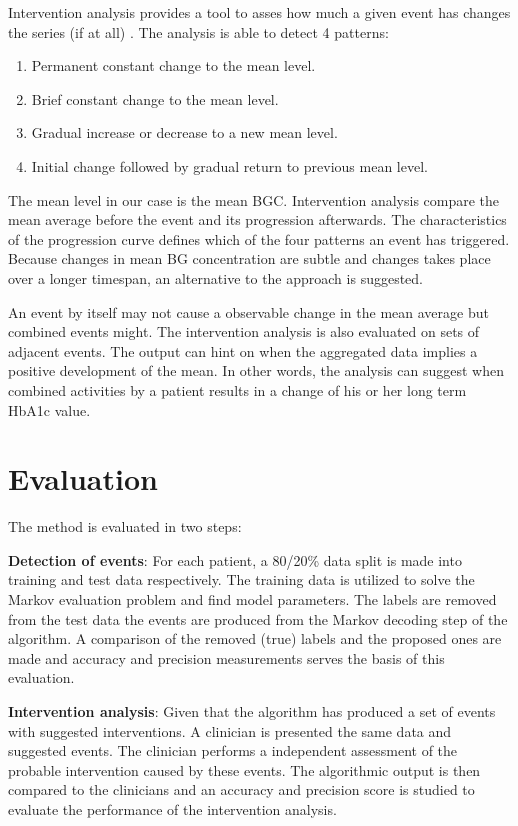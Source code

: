 Intervention analysis provides a tool to asses how much a given event has changes the series (if at all) \parencite{box2015time}.
The analysis is able to detect 4 patterns:

\begin{enumerate}
  \item Permanent constant change to the mean level.
  \item Brief constant change to the mean level.
  \item Gradual increase or decrease to a new mean level.
  \item Initial change followed by gradual return to previous mean level.
\end{enumerate}

The mean level in our case is the mean BGC.
Intervention analysis compare the mean average before the event and its progression afterwards.
The characteristics of the progression curve defines which of the four patterns an event has triggered.
Because changes in mean BG concentration are subtle and changes takes place over a longer timespan, an alternative to the approach is suggested.

An event by itself may not cause a observable change in the mean average but combined events might.
The intervention analysis is also evaluated on sets of adjacent events.
The output can hint on when the aggregated data implies a positive development of the mean.
In other words, the analysis can suggest when combined activities by a patient results in a change of his or her long term HbA1c value.

\section{Evaluation}

The method is evaluated in two steps:

\textbf{Detection of events}: For each patient, a 80/20\% data split is made into training and test data respectively.
The training data is utilized to solve the Markov evaluation problem and find model parameters.
The labels are removed from the test data the events are produced from the Markov decoding step of the algorithm.
A comparison of the removed (true) labels and the proposed ones are made and accuracy and precision measurements serves the basis of this evaluation.

\textbf{Intervention analysis}: Given that the algorithm has produced a set of events with suggested interventions.
A clinician is presented the same data and suggested events.
The clinician performs a independent assessment of the probable intervention caused by these events.
The algorithmic output is then compared to the clinicians and an accuracy and precision score is studied to evaluate the performance of the intervention analysis.
